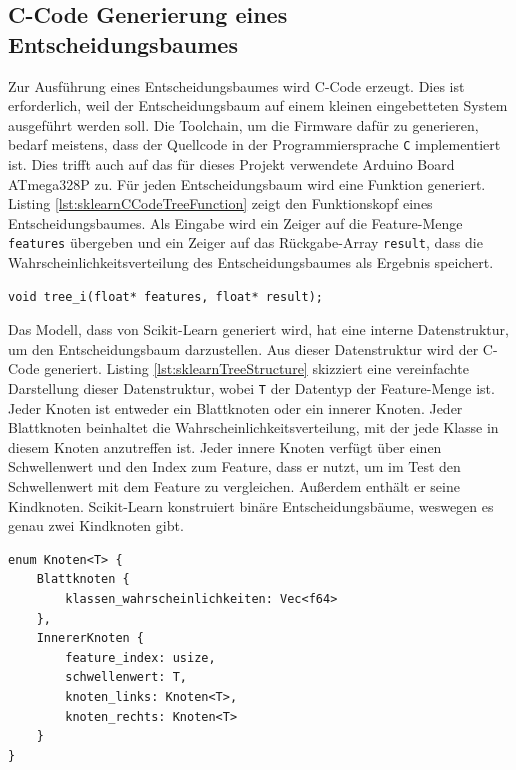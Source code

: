 \subsection{C-Code Generierung eines Entscheidungsbaumes}
\label{sec:cCodeTree}
Zur Ausführung eines Entscheidungsbaumes wird C-Code erzeugt. Dies ist erforderlich, weil der Entscheidungsbaum auf einem kleinen eingebetteten System ausgeführt werden soll. Die Toolchain, um die Firmware
dafür zu generieren, bedarf meistens, dass der Quellcode in der Programmiersprache \texttt{C} implementiert ist. Dies trifft auch auf das für dieses Projekt verwendete Arduino Board ATmega328P zu.
\newline
\newline
Für jeden Entscheidungsbaum wird eine Funktion generiert. Listing \ref{lst:sklearnCCodeTreeFunction} zeigt den Funktionskopf eines Entscheidungsbaumes. Als Eingabe wird ein Zeiger auf die Feature-Menge
\texttt{features} übergeben und ein Zeiger auf das Rückgabe-Array \texttt{result}, dass die Wahrscheinlichkeitsverteilung des Entscheidungsbaumes als Ergebnis speichert.
\begin{lstlisting}[label=lst:sklearnCCodeTreeFunction,caption={C-Code Funktionskopf eines Baumes $i$.}]
void tree_i(float* features, float* result);
\end{lstlisting}
Das Modell, dass von Scikit-Learn generiert wird, hat eine interne Datenstruktur, um den Entscheidungsbaum darzustellen. Aus dieser Datenstruktur wird der C-Code generiert. Listing
\ref{lst:sklearnTreeStructure} skizziert eine vereinfachte Darstellung dieser Datenstruktur, wobei \texttt{T} der Datentyp der Feature-Menge ist. Jeder Knoten ist entweder ein Blattknoten oder
ein innerer Knoten. Jeder Blattknoten beinhaltet die Wahrscheinlichkeitsverteilung, mit der jede Klasse in diesem Knoten anzutreffen ist. Jeder innere Knoten verfügt über einen Schwellenwert und
den Index zum Feature, dass er nutzt, um im Test den Schwellenwert mit dem Feature zu vergleichen. Außerdem enthält er seine Kindknoten. Scikit-Learn konstruiert binäre Entscheidungsbäume,
weswegen es genau zwei Kindknoten gibt.
\begin{lstlisting}[label=lst:sklearnTreeStructure,caption={Vereinfachte Datenstruktur von Scikit-Learn für Entscheidungsbäume.}]
enum Knoten<T> {
    Blattknoten {
        klassen_wahrscheinlichkeiten: Vec<f64>
    },
    InnererKnoten {
        feature_index: usize,
        schwellenwert: T,
        knoten_links: Knoten<T>,
        knoten_rechts: Knoten<T>
    }
}
\end{lstlisting}
